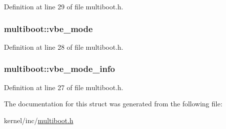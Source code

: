 Definition at line 29 of file multiboot.\-h.

\hypertarget{structmultiboot_ac7cfbb437ea598de2cf5b7d6c9d00a43}{
\subsubsection[{vbe\-\_\-mode}]{ multiboot\-::vbe\-\_\-mode}}\label{structmultiboot_ac7cfbb437ea598de2cf5b7d6c9d00a43}


Definition at line 28 of file multiboot.\-h.

\hypertarget{structmultiboot_a58ad75a9d9fd3c24eb6950c2044291b3}{
\subsubsection[{vbe\-\_\-mode\-\_\-info}]{ multiboot\-::vbe\-\_\-mode\-\_\-info}}\label{structmultiboot_a58ad75a9d9fd3c24eb6950c2044291b3}


Definition at line 27 of file multiboot.\-h.



The documentation for this struct was generated from the following file\-:\begin{DoxyCompactItemize}
\item 
kernel/inc/\hyperlink{multiboot_8h}{multiboot.\-h}\end{DoxyCompactItemize}
